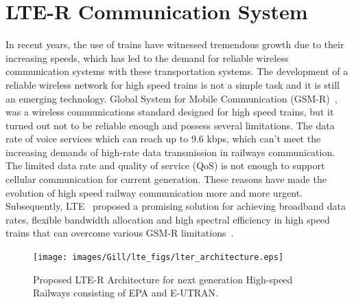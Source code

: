 \section{LTE-R Communication System}

In recent years, the use of trains have witnessed tremendous growth due to their increasing speeds, which has led to the demand for reliable wireless communication systems with these transportation systems. The development of a reliable wireless network for high speed trains is not a simple task and it is still an emerging technology. Global System for Mobile
Communication (GSM-R)~\cite{trlter1}, was a wireless communications standard designed for high speed trains, but it turned out not to be reliable enough and possess several limitations. The data rate of voice services which can reach up to 9.6 kbps, which can't meet the increasing demands of high-rate data transmission in railways communication. The limited data rate and quality of service (QoS) is not enough to support cellular communication for current generation. These reasons have made the evolution of high speed railway communication more and more urgent.  Subsequently, LTE~\cite{trlter2} proposed a promising solution for achieving broadband data rates, flexible bandwidth allocation and high spectral efficiency in high speed trains that can overcome various GSM-R limitations~\cite{arlter3,inplter4}.

\begin{figure}[!ht]
\centering
\texttt{[image: images/Gill/lte\_figs/lter\_architecture.eps]} 
\caption{Proposed LTE-R Architecture for next generation High-speed Railways consisting of EPA and E-UTRAN.}
\label{ltearch}
\end{figure}

